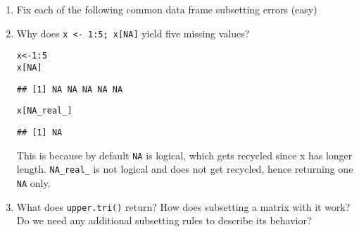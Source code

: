 \documentclass{article}\usepackage[]{graphicx}\usepackage[]{color}
\makeatletter
\newcommand{\hlnum}[1]{\textcolor[rgb]{0.686,0.059,0.569}{#1}}%
\newcommand{\hlopt}[1]{\textcolor[rgb]{0,0,0}{#1}}%
\newcommand{\hlstd}[1]{\textcolor[rgb]{0.345,0.345,0.345}{#1}}%
\newcommand{\hlkwb}[1]{\textcolor[rgb]{0.69,0.353,0.396}{#1}}%
\newenvironment{kframe}{%
 \def\at@end@of@kframe{}%
 \ifinner\ifhmode%
  \def\at@end@of@kframe{\end{minipage}}%
  \begin{minipage}{\columnwidth}%
 \fi\fi%
 \def\FrameCommand##1{\hskip\@totalleftmargin \hskip-\fboxsep
 \colorbox{shadecolor}{##1}\hskip-\fboxsep
     \hskip-\linewidth \hskip-\@totalleftmargin \hskip\columnwidth}%
 \MakeFramed {\advance\hsize-\width
   \@totalleftmargin\z@ \linewidth\hsize
   \@setminipage}}%
 {\par\unskip\endMakeFramed%
 \at@end@of@kframe}
\newenvironment{knitrout}{}{} %
\makeatother
\begin{document}
\begin{enumerate}

\item Fix each of the following common data frame subsetting errors (easy)

\item Why does \verb`x <- 1:5; x[NA]` yield five missing values?

\begin{knitrout}
\color{fgcolor}\begin{kframe}
\begin{alltt}
\hlstd{x} \hlkwb{<-} \hlnum{1}\hlopt{:}\hlnum{5}
\hlstd{x[}\hlnum{NA}\hlstd{]}
\end{alltt}
\begin{verbatim}
## [1] NA NA NA NA NA
\end{verbatim}
\begin{alltt}
\hlstd{x[}\hlnum{NA_real_}\hlstd{]}
\end{alltt}
\begin{verbatim}
## [1] NA
\end{verbatim}
\end{kframe}
\end{knitrout}

This is because by default \verb`NA` is logical, which gets recycled since x has longer length. \verb`NA_real_` is not logical and does not get recycled, hence returning one \verb`NA` only.

\item What does \verb`upper.tri()` return? How does subsetting a matrix with it work? Do we need any additional subsetting rules to describe its behavior?


\end{enumerate}
\end{document}
